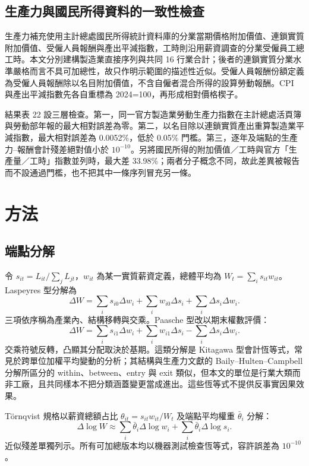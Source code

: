 \documentclass[12pt]{article}
\begin{document}
\subsection{生產力與國民所得資料的一致性檢查}

生產力補充使用主計總處國民所得統計資料庫的分業當期價格附加價值、連鎖實質附加價值、受僱人員報酬與產出平減指數\citep{dgbas-national-accounts}，工時則沿用薪資調查的分業受僱員工總工時。本文分別建構製造業直接序列與共同 16 行業合計；後者的連鎖實質分業水準嚴格而言不具可加總性，故只作明示範圍的描述性近似。受僱人員報酬份額定義為受僱人員報酬除以名目附加價值，不含自僱者混合所得的設算勞動報酬。CPI 與產出平減指數先各自重標為 2024=100，再形成相對價格楔子。

結果表 22 設三層檢查。第一，同一官方製造業勞動生產力指數在主計總處活頁簿與勞動部年報的最大相對誤差為零。第二，以名目除以連鎖實質產出重算製造業平減指數，最大相對誤差為 0.0052\%，低於 0.05\% 門檻。第三，逐年及端點的生產力--報酬會計殘差絕對值小於 $10^{-10}$。另將國民所得的附加價值／工時與官方「生產量／工時」指數並列時，最大差 33.98\%；兩者分子概念不同，故此差異被報告而不設通過門檻，也不把其中一條序列冒充另一條。

\section{方法}

\subsection{端點分解}

令 $s_{it}=L_{it}/\sum_jL_{jt}$，$w_{it}$ 為某一實質薪資定義，總體平均為 $W_t=\sum_i s_{it}w_{it}$。Laspeyres 型分解為
\[
\Delta W=\sum_i s_{i0}\Delta w_i+\sum_i w_{i0}\Delta s_i+\sum_i\Delta s_i\Delta w_i.
\]
三項依序稱為產業內、結構移轉與交乘。Paasche 型改以期末權數評價：
\[
\Delta W=\sum_i s_{i1}\Delta w_i+\sum_i w_{i1}\Delta s_i-\sum_i\Delta s_i\Delta w_i.
\]
交乘符號反轉，凸顯其分配取決於基期。這類分解是 Kitagawa 型會計恆等式\citep{kitagawa1955}，常見於跨單位加權平均變動的分析；其結構與生產力文獻的 Baily--Hulten--Campbell 分解所區分的 within、between、entry 與 exit 類似\citep{baily1992}，但本文的單位是行業大類而非工廠，且共同樣本不把分類涵蓋變更當成進出。這些恆等式不提供反事實因果效果。

Törnqvist 規格以薪資總額占比 $\theta_{it}=s_{it}w_{it}/W_t$ 及端點平均權重 $\bar\theta_i$ 分解：
\[
\Delta\log W\approx
\sum_i\bar\theta_i\Delta\log w_i+
\sum_i\bar\theta_i\Delta\log s_i.
\]
近似殘差單獨列示。所有可加總版本均以機器測試檢查恆等式，容許誤差為 $10^{-10}$。
\end{document}
